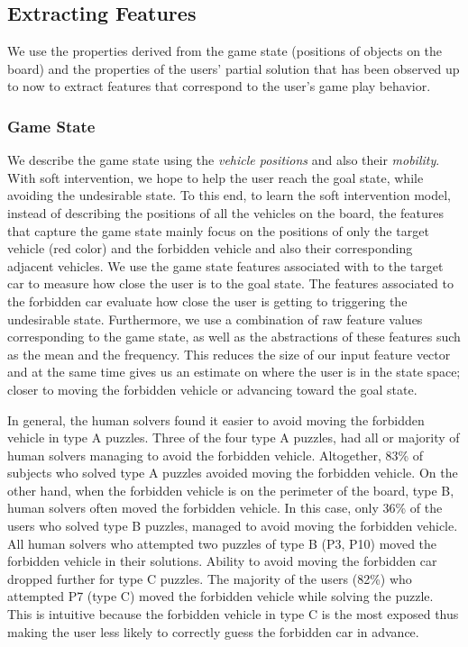 \documentclass[doctor]{thesis} %
\theoremstyle{plain}
\begin{document}
\subsection*{Extracting Features}
We use the properties derived from the game state (positions of objects on the board) and the properties of the users' partial solution that has been observed up to now to extract features that correspond to the user's game play behavior. 
\subsubsection*{Game State}
We describe the game state using the \textit{vehicle positions} and  also their \textit{mobility}. With soft intervention, we hope to help the user reach the goal state, while avoiding the undesirable state. To this end, to learn the soft intervention model, instead of describing the positions of all the vehicles on the board, the features that capture the game state mainly focus on the positions of only the target vehicle (red color) and the forbidden vehicle and also their corresponding adjacent vehicles. We use the game state features associated with to the target car to measure how close the user is to the goal state. The features associated to the forbidden car evaluate how close the user is getting to triggering the undesirable state. Furthermore, we use a combination of raw feature values corresponding to the game state, as well as the abstractions of these features such as the mean and the frequency. This reduces the size of our input feature vector and at the same time gives us an estimate on where the user is in the state space; closer to moving the forbidden vehicle or advancing toward the goal state.

In general, the human solvers found it easier to avoid moving the forbidden vehicle in type A puzzles. Three of the four type A puzzles, had all or majority of human solvers managing to avoid the forbidden vehicle. Altogether, 83\% of subjects who solved type A puzzles avoided moving the forbidden vehicle. On the other hand, when the forbidden vehicle is on the perimeter of the board, type B, human solvers often moved the forbidden vehicle. In this case, only 36\% of the users who solved type B puzzles, managed to avoid moving the forbidden vehicle. All human solvers who attempted two puzzles of type B (P3, P10) moved the forbidden vehicle in their solutions. Ability to avoid moving the forbidden car dropped further for type C puzzles. The majority of the users (82\%) who attempted P7 (type C) moved the forbidden vehicle while solving the puzzle. This is intuitive because the forbidden vehicle in type C is the most exposed thus making the user less likely to correctly guess the forbidden car in advance.
\end{document}
